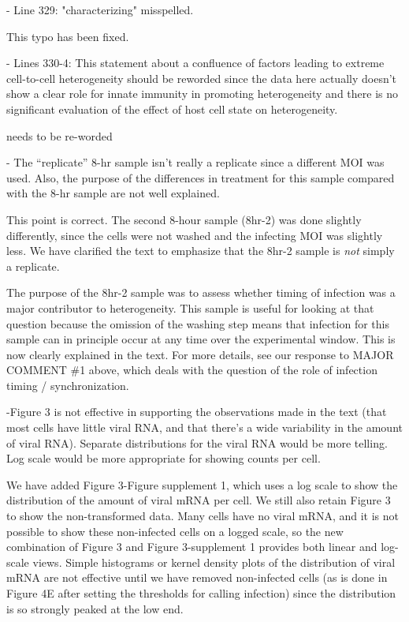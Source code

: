 \documentclass[11pt, oneside]{article}   	%
\begin{document}
- Line 329: "characterizing" misspelled. 

{\color{black}
This typo has been fixed.
}

- Lines 330-4: This statement about a confluence of factors leading to extreme cell-to-cell heterogeneity should be reworded since the data here actually doesn't show a clear role for innate immunity in promoting heterogeneity and there is no significant evaluation of the effect of host cell state on heterogeneity. 

{\color{red} needs to be re-worded}

- The ``replicate'' 8-hr sample isn't really a replicate since a different MOI was used. Also, the purpose of the differences in treatment for this sample compared with the 8-hr sample are not well explained. 

{\color{black}
This point is correct.
The second 8-hour sample (8hr-2) was done slightly differently, since the cells were not washed and the infecting MOI was slightly less.
We have clarified the text to emphasize that the 8hr-2 sample is \emph{not} simply a replicate.

The purpose of the 8hr-2 sample was to assess whether timing of infection was a major contributor to heterogeneity.
This sample is useful for looking at that question because the omission of the washing step means that infection for this sample can in principle occur at any time over the experimental window.
This is now clearly explained in the text.
For more details, see our response to MAJOR COMMENT \#1 above, which deals with the question of the role of infection timing / synchronization.
}

-Figure 3 is not effective in supporting the observations made in the text (that most cells have little viral RNA, and that there's a wide variability in the amount of viral RNA). Separate distributions for the viral RNA would be more telling. Log scale would be more appropriate for showing counts per cell. 

{\color{black} 
We have added Figure 3-Figure supplement 1, which uses a log scale to show the distribution of the amount of viral mRNA per cell.
We still also retain Figure 3 to show the non-transformed data.
Many cells have no viral mRNA, and it is not possible to show these non-infected cells on a logged scale, so the new combination of Figure 3 and Figure 3-supplement 1 provides both linear and log-scale views.
Simple histograms or kernel density plots of the distribution of viral mRNA are not effective until we have removed non-infected cells (as is done in Figure 4E after setting the thresholds for calling infection) since the distribution is so strongly peaked at the low end.
}
\end{document}
